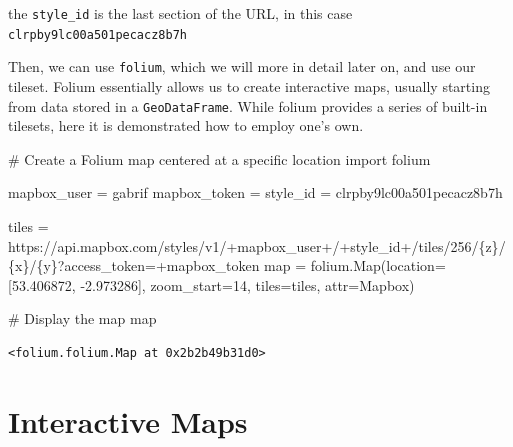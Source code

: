 \documentclass[
  letterpaper,
  DIV=11,
  numbers=noendperiod]{scrreprt}
\newenvironment{Shaded}{\begin{snugshade}}{\end{snugshade}}
\newcommand{\BuiltInTok}[1]{\textcolor[rgb]{0.00,0.23,0.31}{#1}}
\newcommand{\CommentTok}[1]{\textcolor[rgb]{0.37,0.37,0.37}{#1}}
\newcommand{\DecValTok}[1]{\textcolor[rgb]{0.68,0.00,0.00}{#1}}
\newcommand{\FloatTok}[1]{\textcolor[rgb]{0.68,0.00,0.00}{#1}}
\newcommand{\ImportTok}[1]{\textcolor[rgb]{0.00,0.46,0.62}{#1}}
\newcommand{\NormalTok}[1]{\textcolor[rgb]{0.00,0.23,0.31}{#1}}
\newcommand{\OperatorTok}[1]{\textcolor[rgb]{0.37,0.37,0.37}{#1}}
\newcommand{\SpecialCharTok}[1]{\textcolor[rgb]{0.37,0.37,0.37}{#1}}
\newcommand{\StringTok}[1]{\textcolor[rgb]{0.13,0.47,0.30}{#1}}
\begin{document}
the \texttt{style\_id} is the last section of the URL, in this case
\texttt{clrpby9lc00a501pecacz8b7h}

Then, we can use \texttt{folium}, which we will more in detail later on,
and use our tileset. Folium essentially allows us to create interactive
maps, usually starting from data stored in a \texttt{GeoDataFrame}.
While folium provides a series of built-in tilesets, here it is
demonstrated how to employ one's own.

\begin{Shaded}
\begin{Highlighting}[]
\CommentTok{\# Create a Folium map centered at a specific location}
\ImportTok{import}\NormalTok{ folium}

\NormalTok{mapbox\_user }\OperatorTok{=} \StringTok{\textquotesingle{}gabrif\textquotesingle{}}
\NormalTok{mapbox\_token }\OperatorTok{=} \StringTok{\textquotesingle{}\textquotesingle{}}
\NormalTok{style\_id }\OperatorTok{=} \StringTok{\textquotesingle{}clrpby9lc00a501pecacz8b7h\textquotesingle{}} 

\NormalTok{tiles }\OperatorTok{=} \StringTok{\textquotesingle{}https://api.mapbox.com/styles/v1/\textquotesingle{}}\OperatorTok{+}\NormalTok{mapbox\_user}\OperatorTok{+}\StringTok{\textquotesingle{}/\textquotesingle{}}\OperatorTok{+}\NormalTok{style\_id}\OperatorTok{+}\StringTok{\textquotesingle{}/tiles/256/}\SpecialCharTok{\{z\}}\StringTok{/}\SpecialCharTok{\{x\}}\StringTok{/}\SpecialCharTok{\{y\}}\StringTok{?access\_token=\textquotesingle{}}\OperatorTok{+}\NormalTok{mapbox\_token}
\BuiltInTok{map} \OperatorTok{=}\NormalTok{ folium.Map(location}\OperatorTok{=}\NormalTok{[}\FloatTok{53.406872}\NormalTok{, }\OperatorTok{{-}}\FloatTok{2.973286}\NormalTok{], zoom\_start}\OperatorTok{=}\DecValTok{14}\NormalTok{,}
\NormalTok{               tiles}\OperatorTok{=}\NormalTok{tiles,}
\NormalTok{               attr}\OperatorTok{=}\StringTok{\textquotesingle{}Mapbox\textquotesingle{}}\NormalTok{)}

\CommentTok{\# Display the map}
\BuiltInTok{map}
\end{Highlighting}
\end{Shaded}

\begin{verbatim}
<folium.folium.Map at 0x2b2b49b31d0>
\end{verbatim}


\chapter{Interactive Maps}\label{interactive-maps}
\end{document}
